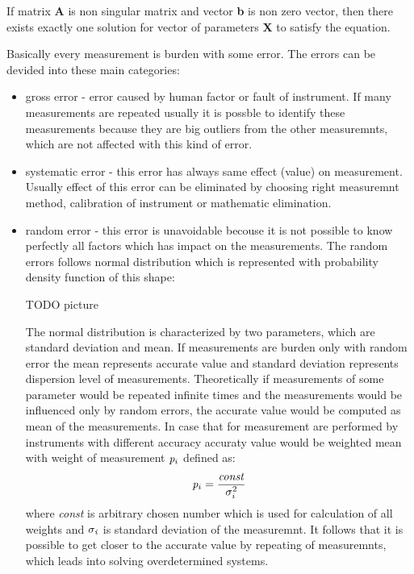 \documentclass[a4paper,12pt]{report}
\newcommand{\ematr}[1]{
{\bf #1}
}
\newcommand{\evect}[1]{
{\bf #1}
}
\newcommand{\escal}[1]{
{\it #1}
}
\begin{document}
If matrix \ematr{A} is 
non singular matrix and vector \evect{b} is non zero vector, then there exists exactly one solution 
for vector of parameters  \evect{X} to satisfy the equation. 

Basically every measurement is burden with some error. The errors can be devided into these main categories:  
\begin{itemize}
\item gross error - error caused by human factor or fault of instrument. If many measurements are repeated
usually it is possble to identify these measurements because they are big outliers from the other measuremnts, which are not affected with this 
kind of error.
\item systematic error - this error has always same effect (value) on measurement.  Usually effect of this error can be 
eliminated by choosing right measuremnt method, calibration of instrument or mathematic elimination.
\item random error - this error is unavoidable becouse it is not possible to know perfectly all factors which has impact 
on the measurements. The random errors follows normal distribution which is represented with probability density function of this shape:

TODO picture


The normal distribution is characterized by two parameters, which are standard deviation and  mean. 
If measurements are burden only with random error the mean represents accurate value and standard deviation represents 
dispersion level of measurements. 
Theoretically  if measurements of some parameter would be repeated infinite times and the measurements would be influenced only by random errors,
the accurate value would be computed as  mean of the measurements. In case that for measurement are performed by instruments with different accuracy
 accuraty value would be weighted mean with weight of measurement $\escal{p}_{i}$ defined as:
\begin{equation}
\escal{p}_{i} = \frac{\escal{const}}{\escal{\sigma}_{i}^{2}}
\end{equation} 
where \escal{const} is arbitrary chosen number which is used for calculation of all weights and $\escal{\sigma_{i}}$ is standard deviation of the measuremnt.
It follows that it is possible to get closer to the accurate value by repeating of measuremnts, which 
leads into solving overdetermined systems. 

\end{itemize}
\end{document}
